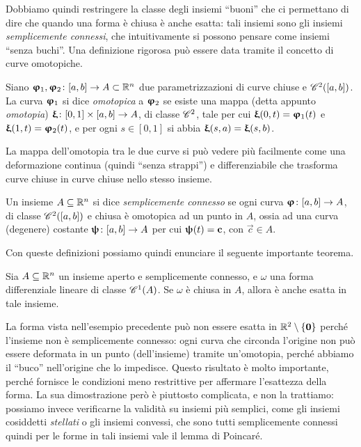 Dobbiamo quindi restringere la classe degli insiemi ``buoni'' che ci permettano di dire che quando una forma è chiusa è anche esatta: tali insiemi sono gli insiemi \emph{semplicemente connessi}, che intuitivamente si possono pensare come insiemi ``senza buchi''.
Una definizione rigorosa può essere data tramite il concetto di curve omotopiche.
\begin{definizione} \label{d:curva-omotopica}
	Siano $\vphi_1,\vphi_2\colon[a,b]\to A\subset\R^n$ due parametrizzazioni di curve chiuse e $\cont[2]{[a,b]}$.
	La curva $\vphi_1$ si dice \emph{omotopica} a $\vphi_2$ se esiste una mappa (detta appunto \emph{omotopia}) $\vxi\colon[0,1]\times[a,b]\to A$, di classe $\cclass[2]$, tale per cui $\vxi(0,t)=\vphi_1(t)$ e $\vxi(1,t)=\vphi_2(t)$, e per ogni $s\in[0,1]$ si abbia $\vxi(s,a)=\vxi(s,b)$.
\end{definizione}
La mappa dell'omotopia tra le due curve si può vedere più facilmente come una deformazione continua (quindi ``senza strappi'') e differenziabile che trasforma curve chiuse in curve chiuse nello stesso insieme.
\begin{definizione} \label{d:insieme-semplicemente-connesso}
	Un insieme $A\subseteq\R^n$ si dice \emph{semplicemente connesso} se ogni curva $\vphi\colon[a,b]\to A$, di classe $\cont[2]{[a,b]}$ e chiusa è omotopica ad un punto in $A$, ossia ad una curva (degenere) costante $\vpsi\colon[a,b]\to A$ per cui $\vpsi(t)=\vec c$, con $\vec c\in A$.
\end{definizione}
Con queste definizioni possiamo quindi enunciare il seguente importante teorema.
\begin{teorema} \label{t:poincare}
	Sia $A\subseteq\R^n$ un insieme aperto e semplicemente connesso, e $\omega$ una forma differenziale lineare di classe $\cont[1]{A}$.
	Se $\omega$ è chiusa in $A$, allora è anche esatta in tale insieme.
\end{teorema}
La forma vista nell'esempio precedente può non essere esatta in $\R^2\setminus\{\vec 0\}$ perch\'e l'insieme non è semplicemente connesso: ogni curva che circonda l'origine non può essere deformata in un punto (dell'insieme) tramite un'omotopia, perch\'e abbiamo il ``buco'' nell'origine che lo impedisce.
Questo risultato è molto importante, perch\'e fornisce le condizioni meno restrittive per affermare l'esattezza della forma.
La sua dimostrazione però è piuttosto complicata, e non la trattiamo: possiamo invece verificarne la validità su insiemi più semplici, come gli insiemi cosiddetti \emph{stellati} o gli insiemi convessi, che sono tutti semplicemente connessi quindi per le forme in tali insiemi vale il lemma di Poincar\'e.
